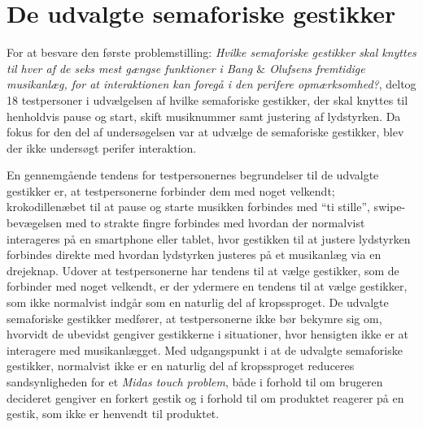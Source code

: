 \section{De udvalgte semaforiske gestikker}
\label{DiskussionUdvalgteGestikker}
%
For at besvare den første problemstilling: \textit{Hvilke semaforiske gestikker skal knyttes til hver af de seks mest gængse funktioner i Bang $\&$ Olufsens fremtidige musikanlæg, for at interaktionen kan foregå i den perifere opmærksomhed?}, deltog 18 testpersoner i udvælgelsen af hvilke semaforiske gestikker, der skal knyttes til henholdvis pause og start, skift musiknummer samt justering af lydstyrken. Da fokus for den del af undersøgelsen var at udvælge de semaforiske gestikker, blev der ikke undersøgt perifer interaktion. 

En gennemgående tendens for testpersonernes begrundelser til de udvalgte gestikker er, at testpersonerne forbinder dem med noget velkendt; krokodillenæbet til at pause og starte musikken forbindes med \enquote{ti stille}, swipe-bevægelsen med to strakte fingre forbindes med hvordan der normalvist interageres på en smartphone eller tablet, hvor gestikken til at justere lydstyrken forbindes direkte med hvordan lydstyrken justeres på et musikanlæg via en drejeknap. Udover at testpersonerne har tendens til at vælge gestikker, som de forbinder med noget velkendt, er der ydermere en tendens til at vælge gestikker, som ikke normalvist indgår som en naturlig del af kropssproget. De udvalgte semaforiske gestikker medfører, at testpersonerne ikke bør bekymre sig om, hvorvidt de ubevidst gengiver gestikkerne i situationer, hvor hensigten ikke er at interagere med musikanlægget. Med udgangspunkt i at de udvalgte semaforiske gestikker, normalvist ikke er en naturlig del af kropssproget reduceres sandsynligheden for et \textit{Midas touch problem}, både i forhold til om brugeren decideret gengiver en forkert gestik og i forhold til om produktet reagerer på en gestik, som ikke er henvendt til produktet. 

